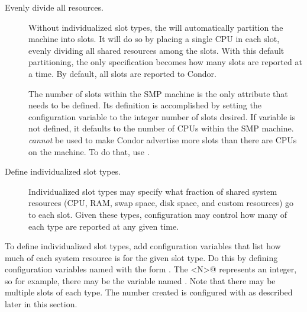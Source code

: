 \begin{description}

\item[Evenly divide all resources.]  
  Without individualized slot types, the  will
  automatically	partition the machine into slots.
  It will do so by placing a single CPU in each slot, 
  evenly dividing all shared resources among the slots.
  With this default partitioning, the only specification becomes how many
  slots are reported at a time.
  By default, all slots are reported to Condor.

  The number of slots within the SMP machine is the only attribute
  that needs to be defined.
  Its definition is accomplished by setting the configuration
  variable  to the integer number of slots desired.
  If variable  is not defined,
  it defaults to the number of CPUs within the SMP machine.
   \emph{cannot} be used to make Condor advertise more
  slots than there are CPUs on the machine.
  To do that, use .

\item[Define individualized slot types.]
  Individualized slot types may specify what fraction of shared
  system resources (CPU, RAM, swap space, disk space, and custom resources)
  go to each slot.
  Given these types, configuration may control how many of each
  type are reported at any given time.

\end{description}

To define individualized slot types, add configuration variables
that list how much of each system resource is for the given slot type.
Do this by defining configuration variables named with the form
.
The \verb@<N>@ represents an integer,
so for example, there may be the variable named .
Note that there may be multiple slots of each type.  The number created
is configured with  as described later in
this section.


